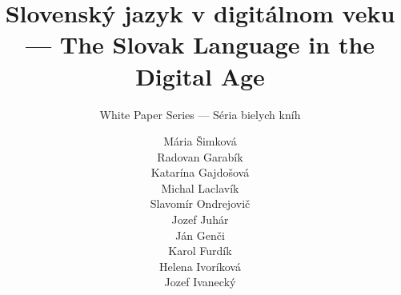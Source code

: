 %                                                                             
%
%
% 

\usepackage{polyglossia}
\usepackage{tipa}


\title{Slovenský jazyk v digitálnom veku --- The \mbox{Slovak} Language in the Digital Age}

\subtitle{White Paper Series --- Séria bielych kníh}

\author{
  Mária Šimková \\
  Radovan Garabík \\
  Katarína Gajdošová \\
  Michal Laclavík \\
  Slavomír Ondrejovič \\
  Jozef Juhár \\
  Ján Genči \\
  Karol Furdík \\
  Helena Ivoríková \\
  Jozef Ivanecký \\
}

